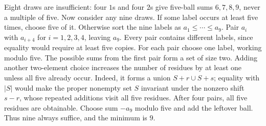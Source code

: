 Eight draws are insufficient: four $1$s and four $2$s give five-ball sums $6,7,8,9$, never a multiple of five.
Now consider any nine draws. If some label occurs at least five times, choose five of it. Otherwise sort the nine labels as $a_1\le\cdots\le a_9$. Pair $a_i$ with $a_{i+4}$ for $i=1,2,3,4$, leaving $a_9$. Every pair contains different labels, since equality would require at least five copies.
For each pair choose one label, working modulo five. The possible sums from the first pair form a set of size two. Adding another two-element choice increases the number of residues by at least one unless all five already occur. Indeed, it forms a union $S+r\cup S+s$; equality with $|S|$ would make the proper nonempty set $S$ invariant under the nonzero shift $s-r$, whose repeated additions visit all five residues. After four pairs, all five residues are obtainable. Choose sum $-a_9$ modulo five and add the leftover ball. Thus nine always suffice, and the minimum is $\boxed9$.
